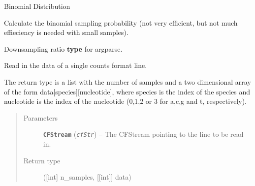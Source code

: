 \documentclass[letterpaper,10pt,english]{sphinxmanual}
\begin{document}

\begin{fulllineitems}
\label{main:libPoMo.main.binom}
Binomial Distribution

Calculate the binomial sampling probability (not very efficient,
but not much effieciency is needed with small samples).

\end{fulllineitems}


\begin{fulllineitems}
\label{main:libPoMo.main.dsRatio}
Downsampling ratio \textbf{type} for argparse.

\end{fulllineitems}


\begin{fulllineitems}
\label{main:libPoMo.main.get_data_from_cf_line}
Read in the data of a single counts format line.

The return type is a list with the number of samples and a two
dimensional array of the form data{[}species{]}{[}nucleotide{]}, where
species is the index of the species and nucleotide is the index of
the nucleotide (0,1,2 or 3 for a,c,g and t, respectively).
\begin{quote}\begin{description}
\item[{Parameters}] \leavevmode
\textbf{\texttt{CFStream}} (\emph{\texttt{cfStr}}) -- The CFStream pointing to the line to be
read in.

\item[{Return type}] \leavevmode
({[}int{]} n\_samples, {[}{[}int{]}{]} data)

\end{description}\end{quote}

\end{fulllineitems}

\end{document}
